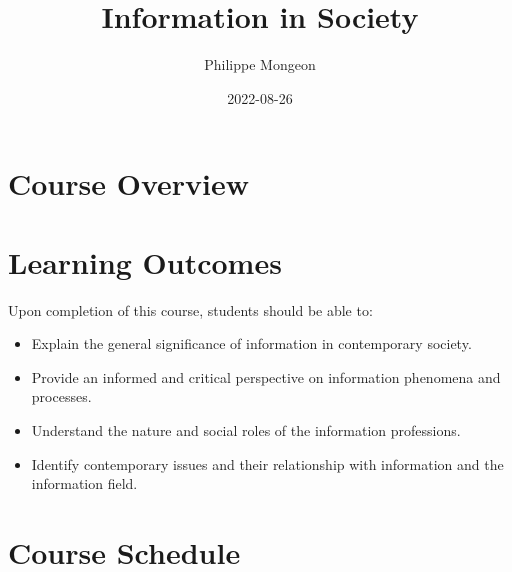 \documentclass[
  letterpaper,
  DIV=11,
  numbers=noendperiod]{scrreprt}
\title{Information in Society}
\author{Philippe Mongeon}
\date{2022-08-26}
\providecommand{\tightlist}{%
  \setlength{\itemsep}{0pt}\setlength{\parskip}{0pt}}
\renewcommand*\contentsname{Table of contents}
\newcommand\contentsname{Table of contents}
\begin{document}
\maketitle

\renewcommand*\contentsname{Table of contents}
{
\setcounter{tocdepth}{2}
\tableofcontents
}


\chapter{Course Overview}\label{course-overview}


\chapter{Learning Outcomes}\label{learning-outcomes}

Upon completion of this course, students should be able to:

\begin{itemize}
\tightlist
\item
  Explain the general significance of information in contemporary
  society.
\item
  Provide an informed and critical perspective on information phenomena
  and processes.
\item
  Understand the nature and social roles of the information professions.
\item
  Identify contemporary issues and their relationship with information
  and the information field.
\end{itemize}


\chapter{Course Schedule}\label{course-schedule}
\end{document}
